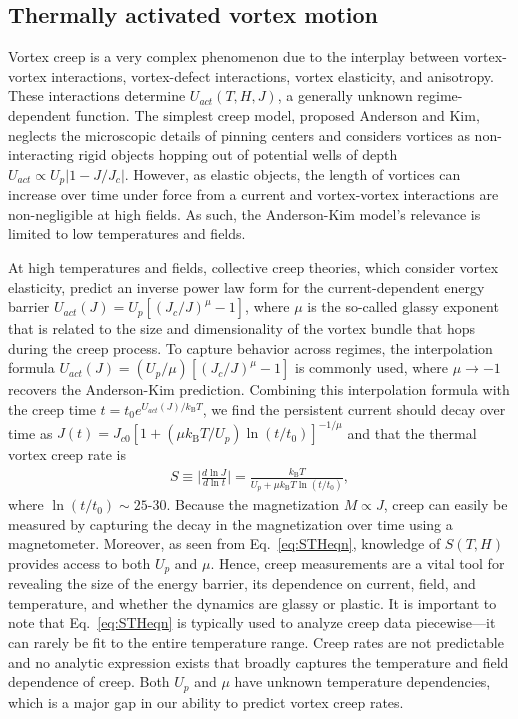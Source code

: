 \documentclass[%
 aip,
 amsmath,amssymb,
 reprint,%
floatfix]{revtex4-1}
\newcommand{\kB}{k_{\mathrm{B}}}
\begin{document}
\subsection{Thermally activated vortex motion}

Vortex creep is a very complex phenomenon due to the interplay between vortex-vortex interactions, vortex-defect interactions, vortex elasticity, and anisotropy. \cite{Blatter1994, Feigelman1989}  \cite{Willa2020a}These interactions determine $U_{act}(T,H,J)$, a generally unknown regime-dependent function. The simplest creep model, proposed Anderson and Kim, neglects the microscopic details of pinning centers and considers vortices as non-interacting rigid objects hopping out of potential wells of depth $U_{act}\propto U_{p}|1 - J/J_c|$. However, as elastic objects, the length of vortices can increase over time under force from a current and vortex-vortex interactions are non-negligible at high fields. As such, the Anderson-Kim model's relevance is limited to low temperatures and fields. 

At high temperatures and fields, collective creep theories, which consider vortex elasticity, predict an inverse power law form for the current-dependent energy barrier $U_{act}(J) = U_{p}[(J_c/J)^{\mu}- 1]$, where $\mu$ is the so-called glassy exponent that is related to the size and dimensionality of the vortex bundle that hops during the creep process\cite{Blatter1991}. To capture behavior across regimes, the interpolation formula $U_{act}(J) = (U_{p}/\mu)\left[(J_c/J)^\mu - 1\right]$ is commonly used, where $\mu \rightarrow - 1$ recovers the Anderson-Kim prediction. Combining this interpolation formula with the creep time $t = t_0e^{U_{act}(J)/\kB T}$, we find the persistent current should decay over time as $J(t) = J_{c0} [1+(\mu \kB T/U_{p})\ln(t/t_0)]^{-1/\mu}$ and that the thermal vortex creep rate is
%
\begin{align}
    S \equiv \Big| \frac{d \ln J}{d \ln t}  \Big| = \frac{\kB T}{U_{p} + \mu \kB T \ln(t/t_0)},\label{eq:STHeqn}
\end{align}
%
where $\ln(t/t_0) \sim 25\text{-}30$. Because the magnetization $M \propto J$, creep can easily be measured by capturing the decay in the magnetization over time using a magnetometer. Moreover, as seen from Eq.~\eqref{eq:STHeqn}, knowledge of $S(T,H)$ provides access to both $U_{p}$ and $\mu$. Hence, creep measurements are a vital tool for revealing the size of the energy barrier, its dependence on current, field, and temperature, and whether the dynamics are glassy or plastic. It is important to note that Eq.~\eqref{eq:STHeqn} is typically used to analyze creep data piecewise---it can rarely be fit to the entire temperature range. Creep rates are not predictable and no analytic expression exists that broadly captures the temperature and field dependence of creep. Both $U_{p}$ and $\mu$ have unknown temperature dependencies, which is a major gap in our ability to predict vortex creep rates.
\end{document}
